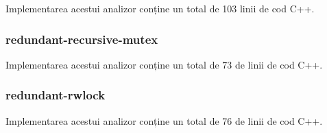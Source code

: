 Implementarea acestui analizor conține un total de 103 linii de cod
C++.

\subsubsection{redundant-recursive-mutex}

Implementarea acestui analizor conține un total de 73 de linii de cod
C++.

\subsubsection{redundant-rwlock}

Implementarea acestui analizor conține un total de 76 de linii de cod
C++.
